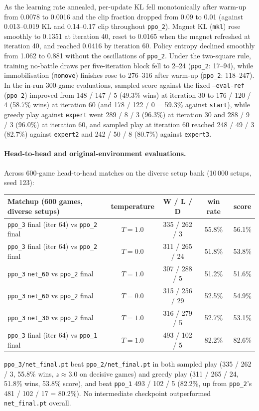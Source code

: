 As the learning rate annealed, per-update KL fell monotonically after warm-up from 0.0078 to
0.0016 and the clip fraction dropped from 0.09 to 0.01 (against 0.013--0.019 KL and 0.14--0.17
clip throughout \texttt{ppo\_2}). Magnet KL (\texttt{mkl}) rose smoothly to 0.1351 at iteration
40, reset to 0.0165 when the magnet refreshed at iteration 40, and reached 0.0416 by iteration 60.
Policy entropy declined smoothly from 1.062 to 0.881 without the oscillations of \texttt{ppo\_2}.
Under the two-square rule, training no-battle draws per five-iteration block fell to 2--24
(\texttt{ppo\_2}: 17--94), while immobilisation (\texttt{nomove}) finishes rose to 276--316 after
warm-up (\texttt{ppo\_2}: 118--247). In the in-run 300-game evaluations, sampled score against the
fixed \texttt{--eval-ref} (\texttt{ppo\_2}) improved from 148 / 147 / 5 (49.3\% wins) at iteration
30 to 176 / 120 / 4 (58.7\% wins) at iteration 60 (and 178 / 122 / 0 = 59.3\% against
\texttt{start}), while greedy play against \texttt{expert} went 289 / 8 / 3 (96.3\%) at iteration
30 and 288 / 9 / 3 (96.0\%) at iteration 60, and sampled play at iteration 60 reached
248 / 49 / 3 (82.7\%) against \texttt{expert2} and 242 / 50 / 8 (80.7\%) against \texttt{expert3}.

\paragraph{Head-to-head and original-environment evaluations.} Across 600-game head-to-head matches
on the diverse setup bank (10\,000 setups, seed 123):
\begin{center}
\small
\begin{tabular}{lcccc}
\toprule
Matchup (600 games, diverse setups) & temperature & W / L / D & win rate & score \\
\midrule
\texttt{ppo\_3} final (iter 64) vs \texttt{ppo\_2} final & $T = 1.0$ & 335 / 262 / 3  & 55.8\% & 56.1\% \\
\texttt{ppo\_3} final (iter 64) vs \texttt{ppo\_2} final & $T = 0.0$ & 311 / 265 / 24 & 51.8\% & 53.8\% \\
\texttt{ppo\_3} \texttt{net\_60} vs \texttt{ppo\_2} final & $T = 1.0$ & 307 / 288 / 5  & 51.2\% & 51.6\% \\
\texttt{ppo\_3} \texttt{net\_60} vs \texttt{ppo\_2} final & $T = 0.0$ & 315 / 256 / 29 & 52.5\% & 54.9\% \\
\texttt{ppo\_3} \texttt{net\_30} vs \texttt{ppo\_2} final & $T = 1.0$ & 316 / 279 / 5  & 52.7\% & 53.1\% \\
\texttt{ppo\_3} final (iter 64) vs \texttt{ppo\_1} final & $T = 1.0$ & 493 / 102 / 5  & 82.2\% & 82.6\% \\
\bottomrule
\end{tabular}
\end{center}
\texttt{ppo\_3/net\_final.pt} beat \texttt{ppo\_2/net\_final.pt} in both sampled play
(335 / 262 / 3, 55.8\% wins, $z \approx 3.0$ on decisive games) and greedy play (311 / 265 / 24,
51.8\% wins, 53.8\% score), and beat \texttt{ppo\_1} 493 / 102 / 5 (82.2\%, up from
\texttt{ppo\_2}'s 481 / 102 / 17 = 80.2\%). No intermediate checkpoint outperformed
\texttt{net\_final.pt} overall.

